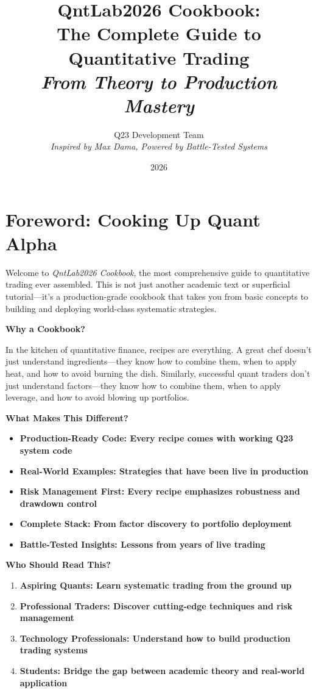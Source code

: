 \documentclass[11pt,letterpaper,openany]{book}
\title{QntLab2026 Cookbook: \\
The Complete Guide to Quantitative Trading \\
\textit{From Theory to Production Mastery}}
\author{Q23 Development Team \\
\textit{Inspired by Max Dama, Powered by Battle-Tested Systems}}
\date{2026}
\begin{document}
\makeatletter
\@openrightfalse
\makeatother

\maketitle

\setcounter{tocdepth}{3}
\tableofcontents

\chapter*{Foreword: Cooking Up Quant Alpha}

Welcome to \textit{QntLab2026 Cookbook}, the most comprehensive guide to quantitative trading ever assembled. This is not just another academic text or superficial tutorial—it's a production-grade cookbook that takes you from basic concepts to building and deploying world-class systematic strategies.

\textbf{Why a Cookbook?}

In the kitchen of quantitative finance, recipes are everything. A great chef doesn't just understand ingredients—they know how to combine them, when to apply heat, and how to avoid burning the dish. Similarly, successful quant traders don't just understand factors—they know how to combine them, when to apply leverage, and how to avoid blowing up portfolios.

\textbf{What Makes This Different?}

\begin{itemize}
    \item \textbf{Production-Ready Code: Every recipe comes with working Q23 system code}
    \item \textbf{Real-World Examples: Strategies that have been live in production}
    \item \textbf{Risk Management First: Every recipe emphasizes robustness and drawdown control}
    \item \textbf{Complete Stack: From factor discovery to portfolio deployment}
    \item \textbf{Battle-Tested Insights: Lessons from years of live trading}
\end{itemize}
\textbf{Who Should Read This?}

\begin{enumerate}
    \item \textbf{Aspiring Quants: Learn systematic trading from the ground up}
    \item \textbf{Professional Traders: Discover cutting-edge techniques and risk management}
    \item \textbf{Technology Professionals: Understand how to build production trading systems}
    \item \textbf{Students: Bridge the gap between academic theory and real-world application}
\end{enumerate}
\end{document}
